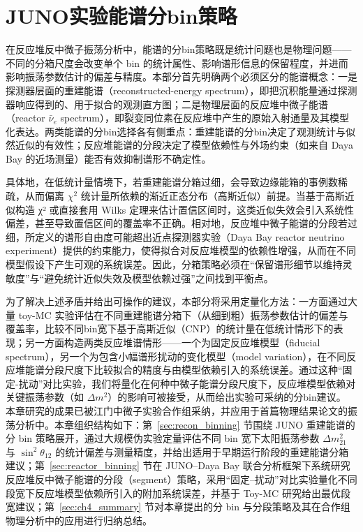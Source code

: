 \chapter{JUNO实验能谱分bin策略}
在反应堆反中微子振荡分析中，能谱的分bin策略既是统计问题也是物理问题——不同的分箱尺度会改变单个 bin 的统计属性、影响谱形信息的保留程度，并进而影响振荡参数估计的偏差与精度。本部分首先明确两个必须区分的能谱概念：一是探测器层面的重建能谱（reconstructed-energy spectrum），即把沉积能量通过探测器响应得到的、用于拟合的观测直方图；二是物理层面的反应堆中微子能谱（reactor $\bar{\nu}_e$ spectrum），即裂变同位素在反应堆中产生的原始入射通量及其模型化表达。两类能谱的分bin选择各有侧重点：重建能谱的分bin决定了观测统计与似然近似的有效性；反应堆能谱的分段决定了模型依赖性与外场约束（如来自 Daya Bay 的近场测量）能否有效抑制谱形不确定性。

具体地，在低统计量情境下，若重建能谱分箱过细，会导致边缘能箱的事例数稀疏，从而偏离 $\chi^2$ 统计量所依赖的渐近正态分布（高斯近似）前提。当基于高斯近似构造 χ² 或直接套用 Wilks 定理来估计置信区间时，这类近似失效会引入系统性偏差，甚至导致置信区间的覆盖率不正确。相对地，反应堆中微子能谱的分段若过细，所定义的谱形自由度可能超出近点探测器实验（Daya Bay reactor neutrino experiment）提供的约束能力，使得拟合对反应堆模型的依赖性增强，从而在不同模型假设下产生可观的系统误差。因此，分箱策略必须在“保留谱形细节以维持灵敏度”与“避免统计近似失效及模型依赖过强”之间找到平衡点。

为了解决上述矛盾并给出可操作的建议，本部分将采用定量化方法：一方面通过大量 toy-MC 实验评估在不同重建能谱分箱下（从细到粗）振荡参数估计的偏差与覆盖率，比较不同bin宽下基于高斯近似（CNP）的统计量在低统计情形下的表现；另一方面构造两类反应堆谱情形——一个为固定反应堆模型（fiducial spectrum），另一个为包含小幅谱形扰动的变化模型（model variation），在不同反应堆能谱分段尺度下比较拟合的精度与由模型依赖引入的系统误差。通过这种“固定-扰动”对比实验，我们将量化在何种中微子能谱分段尺度下，反应堆模型依赖对关键振荡参数（如 $\Delta m^2$）的影响可被接受，从而给出实验可采纳的分bin建议。
本章研究的成果已被江门中微子实验合作组采纳，并应用于首篇物理结果论文的振荡分析中。本章组织结构如下：第~\ref{sec:recon_binning} 节围绕 JUNO 重建能谱的分 bin 策略展开，通过大规模伪实验定量评估不同 bin 宽下太阳振荡参数 $\Delta m^2_{21}$ 与 $\sin^2\theta_{12}$ 的统计偏差与测量精度，并给出适用于早期运行阶段的重建能谱分箱建议；第~\ref{sec:reactor_binning} 节在 JUNO--Daya Bay 联合分析框架下系统研究反应堆反中微子能谱的分段（segment）策略，采用“固定--扰动”对比实验量化不同段宽下反应堆模型依赖所引入的附加系统误差，并基于 Toy-MC 研究给出最优段宽建议；第~\ref{sec:ch4_summary} 节对本章提出的分 bin 与分段策略及其在合作组物理分析中的应用进行归纳总结。

